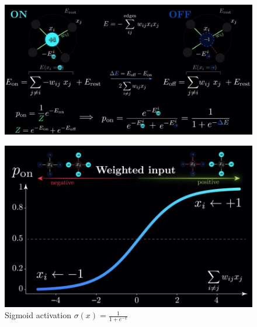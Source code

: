 \documentclass{antclass}
\begin{document}
\pagebreak

\begin{figure}[H]
			\centering
	\includegraphics[width=\linewidth]{pics/BM/update-rule-hq.jpg}

	\label{fig:update-rule}
\end{figure}


\begin{figure}[H]
	\centering
	\includegraphics[width=0.8\linewidth]{pics/BM/sigmoid.jpg}
		\caption{Sigmoid activation \(\sigma(x)=\frac{1}{1+e^{-x}}\)}
	\label{fig:sigmoid}
\end{figure}
\end{document}
